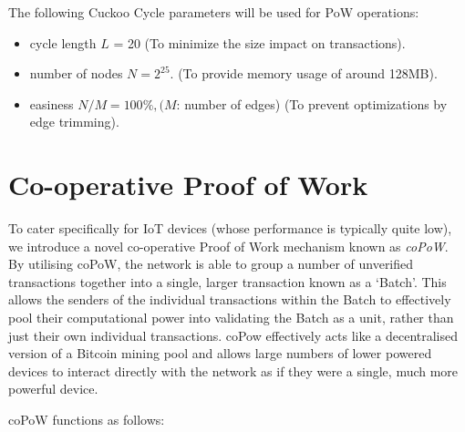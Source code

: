 \documentclass[a4paper,10pt,twocolumn]{article}
\begin{document}
The following Cuckoo Cycle parameters will be used for PoW operations:

\begin{itemize}
	\item cycle length \( L\) = 20 (To minimize the size impact on transactions).
    \item number of nodes \( N = 2^{25} \). (To provide memory usage of around 128MB\@).
    \item easiness \(N/M = 100\% , (M\): number of edges) (To prevent optimizations by edge trimming).
\end{itemize}

\section{Co-operative Proof of Work}
\label{sec:coPoW}

To cater specifically for IoT devices (whose performance is typically quite low), we introduce a novel co-operative Proof of Work 
mechanism known as \emph{coPoW}. By utilising coPoW, the network is able to group a number of unverified transactions together into a 
single, larger transaction known as a `Batch'. This allows the senders of the individual transactions within the Batch to effectively 
pool their computational power into validating the Batch as a unit, rather than just their own individual transactions.
coPow effectively acts like a decentralised version of a Bitcoin mining pool and allows large numbers of lower powered devices to interact directly with the network as if they were a single, much more powerful device.

coPoW functions as follows:
\end{document}
